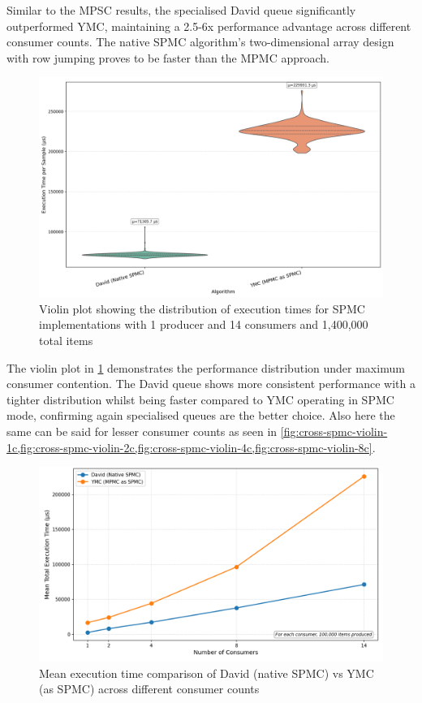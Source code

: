 Similar to the \ac{MPSC} results, the specialised David queue significantly outperformed \ac{YMC}, maintaining a 2.5-6x performance advantage across different consumer counts. The native \ac{SPMC} algorithm's two-dimensional array design with row jumping proves to be faster than the \ac{MPMC} approach.

\begin{figure}[htb]
\centering
\caption{Violin plot showing the distribution of execution times for \ac{SPMC} implementations with 1 producer and 14 consumers and 1,400,000 total items}
\label{fig:spmc-violin-14c}
\includegraphics[width=\textwidth]{images/results/best_in_spmc_performance_violin_1P14C.png}
\end{figure}

The violin plot in \cref{fig:spmc-violin-14c} demonstrates the performance distribution under maximum consumer contention. The David queue shows more consistent performance with a tighter distribution whilst being faster compared to \ac{YMC} operating in SPMC mode, confirming again specialised queues are the better choice. Also here the same can be said for lesser consumer counts as seen in \cref{fig:cross-spmc-violin-1c,fig:cross-spmc-violin-2c,fig:cross-spmc-violin-4c,fig:cross-spmc-violin-8c}.

\begin{figure}[htb]
\centering
\caption{Mean execution time comparison of David (native SPMC) vs YMC (as SPMC) across different consumer counts}
\label{fig:cross-spmc-mean}
\includegraphics[width=\textwidth]{images/results/best_in_spmc_mean_performance_vs_consumers.png}
\end{figure}